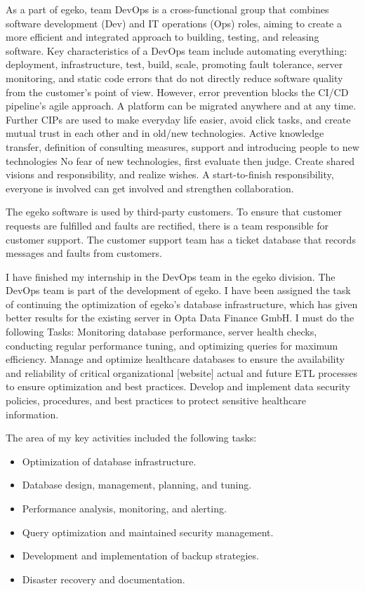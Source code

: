 As a part of egeko, team DevOps is a cross-functional group that combines software development (Dev) and IT operations (Ops) roles, aiming to create a more efficient and integrated approach to building, testing, and releasing software. Key characteristics of a DevOps team include automating everything: deployment, infrastructure, test, build, scale, promoting fault tolerance, server monitoring, and static code errors that do not directly reduce software quality from the customer's point of view. However, error prevention blocks the CI/CD pipeline's agile approach. A platform can be migrated anywhere and at any time. Further CIPs are used to make everyday life easier, avoid click tasks, and create mutual trust in each other and in old/new technologies. Active knowledge transfer, definition of consulting measures, support and introducing people to new technologies No fear of new technologies, first evaluate then judge. Create shared visions and responsibility, and realize wishes. A start-to-finish responsibility, everyone is involved can get involved and strengthen collaboration.\vspace{.4cm}

The egeko software is used by third-party customers. To ensure that customer requests are fulfilled and faults are rectified, there is a team responsible for customer support. The customer support team has a ticket database that records messages and faults from customers.\vspace{.4cm}

I have finished my internship in the DevOps team in the egeko division. The DevOps team is part of the development of egeko. I have been assigned the task of continuing the optimization of egeko's database infrastructure, which has given better results for the existing server in Opta Data Finance GmbH. I must do the following Tasks: Monitoring database performance, server health checks, conducting regular performance tuning, and optimizing queries for maximum efficiency. Manage and optimize healthcare databases to ensure the availability and reliability of critical organizational [website] actual and future ETL processes to ensure optimization and best practices. Develop and implement data security policies, procedures, and best practices to protect sensitive healthcare information.\vspace{.4cm}

The area of my key activities included the following tasks:
\begin{itemize}
    \item Optimization of database infrastructure.
    \item Database design, management, planning, and tuning.
    \item Performance analysis, monitoring, and alerting.
    \item Query optimization and maintained security management.
    \item Development and implementation of backup strategies.
    \item Disaster recovery and documentation.
\end{itemize}

